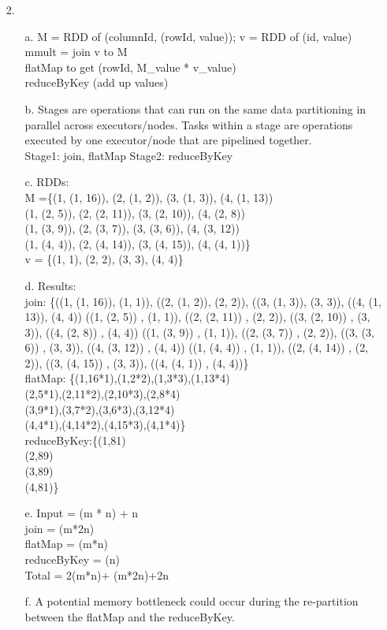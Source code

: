 \documentclass{article}
\begin{document}
\begin{itemize}
\pagebreak
\setlength{\headsep}{5pt}
\item[2.]
	\begin{itemize}
		\item[a.] M = RDD of (columnId, (rowId, value)); v = RDD of (id, value)\\
			mmult = join v to M\\
				flatMap to get (rowId, M\_value * v\_value)\\ 
				reduceByKey (add up values)
		\item[b.] Stages are operations that can run on the same data partitioning in parallel across executors/nodes. Tasks within a stage are operations executed by one executor/node that are pipelined together.\\
Stage1: join, flatMap Stage2: reduceByKey
		\item[c.] RDDs:\\
		M =\{(1, (1, 16)), (2, (1, 2)), (3, (1, 3)), (4, (1, 13))\\
			(1, (2, 5)), (2, (2, 11)), (3, (2, 10)), (4, (2, 8))\\
			(1, (3, 9)), (2, (3, 7)), (3, (3, 6)), (4, (3, 12))\\
			(1, (4, 4)), (2, (4, 14)), (3, (4, 15)), (4, (4, 1))\}\\
		v = \{(1, 1), (2, 2), (3, 3), (4, 4)\}
		\item[d.] Results:\\
		join: \{((1, (1, 16)), (1, 1)), ((2, (1, 2)), (2, 2)), ((3, (1, 3)), (3, 3)), ((4, (1, 13)), (4, 4))
			((1, (2, 5)) , (1, 1)), ((2, (2, 11)) , (2, 2)), ((3, (2, 10)) , (3, 3)), ((4, (2, 8)) , (4, 4))
			((1, (3, 9)) , (1, 1)), ((2, (3, 7)) , (2, 2)), ((3, (3, 6)) , (3, 3)), ((4, (3, 12)) , (4, 4))
			((1, (4, 4)) , (1, 1)), ((2, (4, 14)) , (2, 2)), ((3, (4, 15)) , (3, 3)), ((4, (4, 1)) , (4, 4))\}\\
		flatMap: \{(1,16*1),(1,2*2),(1,3*3),(1,13*4)\\
			(2,5*1),(2,11*2),(2,10*3),(2,8*4)\\
			(3,9*1),(3,7*2),(3,6*3),(3,12*4)\\
			(4,4*1),(4,14*2),(4,15*3),(4,1*4)\}\\
		reduceByKey:\{(1,81)\\
			(2,89)\\
			(3,89)\\
			(4,81)\}
		\item[e.]Input = (m * n) + n\\
			join = (m*2n)\\
			flatMap = (m*n)\\
			reduceByKey = (n)\\
			Total = 2(m*n)+ (m*2n)+2n
		\item[f.] A potential memory bottleneck could occur during the re-partition between the flatMap and the reduceByKey.
	\end{itemize}
	

\end{itemize}
\end{document}
